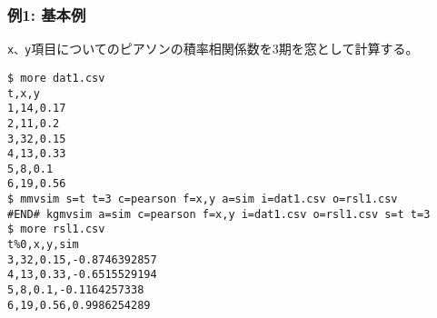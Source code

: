 \subsubsection*{例1: 基本例}

\verb|x、y|項目についてのピアソンの積率相関係数を3期を窓として計算する。


\begin{Verbatim}[baselinestretch=0.7,frame=single]
$ more dat1.csv
t,x,y
1,14,0.17
2,11,0.2
3,32,0.15
4,13,0.33
5,8,0.1
6,19,0.56
$ mmvsim s=t t=3 c=pearson f=x,y a=sim i=dat1.csv o=rsl1.csv
#END# kgmvsim a=sim c=pearson f=x,y i=dat1.csv o=rsl1.csv s=t t=3
$ more rsl1.csv
t%0,x,y,sim
3,32,0.15,-0.8746392857
4,13,0.33,-0.6515529194
5,8,0.1,-0.1164257338
6,19,0.56,0.9986254289
\end{Verbatim}

